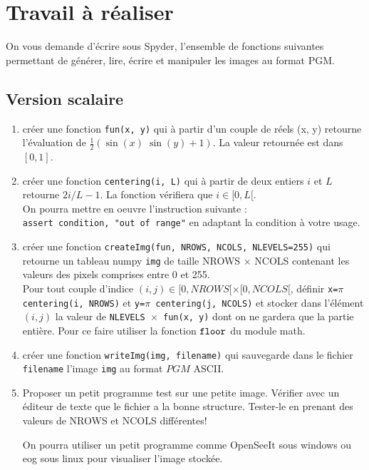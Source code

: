 \documentclass[a4paper, 10pt]{article}
\begin{document}
\section{Travail à réaliser}
On vous demande d'écrire sous Spyder, l'ensemble de fonctions suivantes permettant de générer, lire, écrire et manipuler les images au format PGM.

\subsection{Version scalaire}
\begin{enumerate} 
\item créer une fonction {\tt fun(x, y)} qui à partir d'un couple de réels (x, y) 
retourne l'évaluation de $\frac{1}{2} (\sin(x)\; \sin(y)+1)$.
La valeur retournée est dans $[0, 1]$.

\item créer une fonction {\tt centering(i, L)} qui à partir de deux entiers $i$ et $L$
retourne $2 i/L-1$. La fonction vérifiera que $i \in [0, L[$. \\
On pourra mettre en oeuvre l'instruction suivante : \\
{\tt assert condition, "out of range"} en adaptant la condition à votre usage.

\item créer une fonction {\tt createImg(fun, NROWS, NCOLS, NLEVELS=255)}
qui retourne un tableau numpy {\tt img} de taille NROWS $\times$ NCOLS contenant les valeurs
des pixels comprises entre 0 et 255. \\
Pour tout couple d'indice $(i, j) \in [0, NROWS[ \times [0, NCOLS[$, définir
{\tt x=$\pi$ centering(i, NROWS)} et {\tt y=$\pi$  centering(j, NCOLS)}
et stocker dans l'élément $(i, j)$ la valeur de {\tt NLEVELS $\times$ fun(x, y)}
dont on ne gardera que la partie entière. Pour ce faire utiliser la fonction $\tt floor$
du module math.

\item créer une fonction {\tt writeImg(img, filename)} qui sauvegarde
dans le fichier {\tt filename} l'image {\tt img} au format $PGM$ ASCII.

\item Proposer un petit programme test sur une petite image. Vérifier
avec un éditeur de texte que le fichier a la bonne structure.
Tester-le en prenant des valeurs de NROWS et NCOLS différentes!

On pourra utiliser un petit programme comme OpenSeeIt sous windows ou eog
sous linux pour visualiser l'image stockée.


\end{enumerate}
\end{document}
